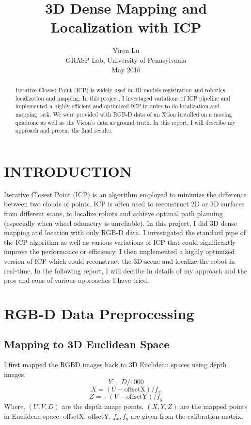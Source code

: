 \documentclass[letterpaper, 10 pt, conference]{ieeeconf}  %
\title{\LARGE \bf
3D Dense Mapping and Localization with ICP
}
\author{
{\rm Yiren Lu}\\
GRASP Lab, University of Pennsylvania\\
May 2016
}
\begin{document}
\maketitle
\thispagestyle{empty}
\pagestyle{empty}


\begin{abstract}

Iterative Closest Point (ICP) is widely used in 3D models registration and robotics localization and mapping. In this project, I investaged variations of ICP pipeline and implemented a highly efficient and optimized ICP in order to do localization and mapping task. We were provided with RGB-D data of an Xtion installed on a moving quadrone as well as the Vicon's data as ground truth. In this report, I will describe my approach and present the final results.\\

\end{abstract}


\section{INTRODUCTION}

Iterative Closest Point (ICP) is an algorithm employed to minimize the difference between two clouds of points. ICP is often used to reconstruct 2D or 3D surfaces from different scans, to localize robots and achieve optimal path planning (especially when wheel odometry is unreliable). In this project, I did 3D dense mapping and location with only RGB-D data. I investigated the standard pipe of the ICP algorithm as well as various variations \cite{c1} \cite{c2} of ICP that could significantly improve the performance or efficiency. I then implemented a highly optimized version of ICP which could reconstruct the 3D scene and localize the robot in real-time. In the following report, I will decribe in details of my approach and the pros and cons of various approaches I have tried.\\

\section{RGB-D Data Preprocessing}
\subsection{Mapping to 3D Euclidean Space}
I first mapped the RGBD images back to 3D Euclidean spaces using depth images. \\
$$
Y = D/1000
$$
$$
X = (U - \mbox{offsetX})/f_{x}
$$
$$
Z = -(V-\mbox{offsetY})/f_{y}
$$
Where, $(U,V,D)$ are the depth image points. $(X,Y,Z)$ are the mapped points in Euclidean space. offsetX, offsetY, $f_x, f_y$ are given from the calibration matrix.\\
\end{document}
